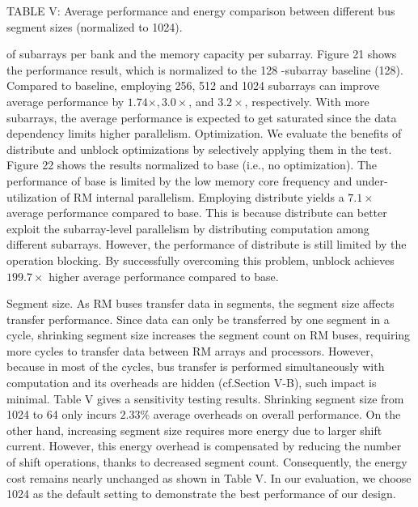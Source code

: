\documentclass[10pt]{article}
\begin{document}
TABLE V: Average performance and energy comparison between different bus segment sizes (normalized to 1024).

of subarrays per bank and the memory capacity per subarray. Figure 21 shows the performance result, which is normalized to the 128 -subarray baseline (128). Compared to baseline, employing 256, 512 and 1024 subarrays can improve average performance by $1.74 \times, 3.0 \times$, and $3.2 \times$, respectively. With more subarrays, the average performance is expected to get saturated since the data dependency limits higher parallelism. Optimization. We evaluate the benefits of distribute and unblock optimizations by selectively applying them in the test. Figure 22 shows the results normalized to base (i.e., no optimization). The performance of base is limited by the low memory core frequency and under-utilization of RM internal parallelism. Employing distribute yields a $7.1 \times$ average performance compared to base. This is because distribute can better exploit the subarray-level parallelism by distributing computation among different subarrays. However, the performance of distribute is still limited by the operation blocking. By successfully overcoming this problem, unblock achieves $199.7 \times$ higher average performance compared to base.

Segment size. As RM buses transfer data in segments, the segment size affects transfer performance. Since data can only be transferred by one segment in a cycle, shrinking segment size increases the segment count on RM buses, requiring more cycles to transfer data between RM arrays and processors. However, because in most of the cycles, bus transfer is performed simultaneously with computation and its overheads are hidden (cf.Section V-B), such impact is minimal. Table V gives a sensitivity testing results. Shrinking segment size from 1024 to 64 only incurs $2.33 \%$ average overheads on overall performance. On the other hand, increasing segment size requires more energy due to larger shift current. However, this energy overhead is compensated by reducing the number of shift operations, thanks to decreased segment count. Consequently, the energy cost remains nearly unchanged as shown in Table V. In our evaluation, we choose 1024 as the default setting to demonstrate the best performance of our design.
\end{document}
